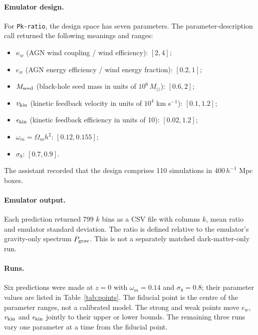 \documentclass[11pt,a4paper]{article}
\begin{document}
\paragraph{Emulator design.} For \texttt{Pk-ratio}, the design space has seven parameters. The parameter-description call returned the following meanings and ranges:
\begin{itemize}
\item $\kappa_w$ (AGN wind coupling / wind efficiency): $[2,4]$;
\item $e_w$ (AGN energy efficiency / wind energy fraction): $[0.2,1]$;
\item $M_{\rm seed}$ (black-hole seed mass in units of $10^6\,M_\odot$): $[0.6,2]$;
\item $v_{\rm kin}$ (kinetic feedback velocity in units of $10^4$ km s$^{-1}$): $[0.1,1.2]$;
\item $\epsilon_{\rm kin}$ (kinetic feedback efficiency in units of 10): $[0.02,1.2]$;
\item $\omega_m=\Omega_m h^2$: $[0.12,0.155]$;
\item $\sigma_8$: $[0.7,0.9]$.
\end{itemize}
The assistant recorded that the design comprises 110 simulations in $400\,h^{-1}$ Mpc boxes.

\paragraph{Emulator output.} Each prediction returned 799 $k$ bins as a CSV file with columns $k$, mean ratio and emulator standard deviation. The ratio is defined relative to the emulator's gravity-only spectrum $P_{\rm grav}$. This is not a separately matched dark-matter-only run.

\paragraph{Runs.} Six predictions were made at $z=0$ with $\omega_m=0.14$ and $\sigma_8=0.8$; their parameter values are listed in Table~\ref{tab:points}. The fiducial point is the centre of the parameter ranges, not a calibrated model. The strong and weak points move $e_w$, $v_{\rm kin}$ and $\epsilon_{\rm kin}$ jointly to their upper or lower bounds. The remaining three runs vary one parameter at a time from the fiducial point.
\end{document}
